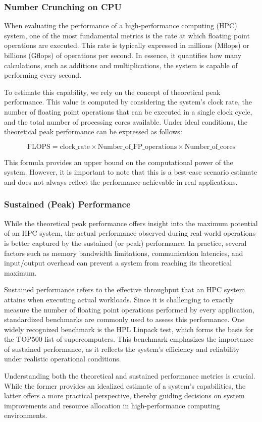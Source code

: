 \subsubsection{Number Crunching on CPU} \label{sec:number_crunching}

When evaluating the performance of a high-performance computing (HPC) system, one of the most fundamental metrics is the rate at which floating point operations are executed. This rate is typically expressed in millions (Mflops) or billions (Gflops) of operations per second. In essence, it quantifies how many calculations, such as additions and multiplications, the system is capable of performing every second.

To estimate this capability, we rely on the concept of theoretical peak performance. This value is computed by considering the system’s clock rate, the number of floating point operations that can be executed in a single clock cycle, and the total number of processing cores available. Under ideal conditions, the theoretical peak performance can be expressed as follows:

$$
\text{FLOPS} = \text{clock\_rate} \times \text{Number\_of\_FP\_operations} \times \text{Number\_of\_cores}
$$

This formula provides an upper bound on the computational power of the system. However, it is important to note that this is a best-case scenario estimate and does not always reflect the performance achievable in real applications.

\subsubsection{Sustained (Peak) Performance} \label{sec:sustained}

While the theoretical peak performance offers insight into the maximum potential of an HPC system, the actual performance observed during real-world operations is better captured by the sustained (or peak) performance. In practice, several factors such as memory bandwidth limitations, communication latencies, and input/output overhead can prevent a system from reaching its theoretical maximum.

Sustained performance refers to the effective throughput that an HPC system attains when executing actual workloads. Since it is challenging to exactly measure the number of floating point operations performed by every application, standardized benchmarks are commonly used to assess this performance. One widely recognized benchmark is the HPL Linpack test, which forms the basis for the TOP500 list of supercomputers. This benchmark emphasizes the importance of sustained performance, as it reflects the system’s efficiency and reliability under realistic operational conditions.

Understanding both the theoretical and sustained performance metrics is crucial. While the former provides an idealized estimate of a system's capabilities, the latter offers a more practical perspective, thereby guiding decisions on system improvements and resource allocation in high-performance computing environments.
